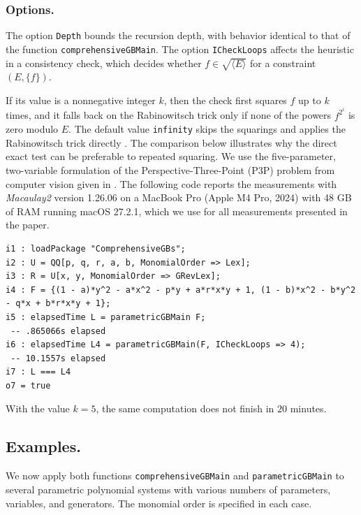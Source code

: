 \documentclass[11pt]{amsart}
\theoremstyle{plain}
\theoremstyle{definition}
\theoremstyle{remark}
\begin{document}
\subsubsection{Options.} The option \texttt{Depth} bounds the recursion depth, with behavior identical to that of the function \texttt{comprehensiveGBMain}.
The option \texttt{ICheckLoops} affects the heuristic in a consistency check, which decides whether $f\in\sqrt{\langle E\rangle}$ for a constraint $(E,\lbrace f\rbrace)$.



If its value is a nonnegative integer $k$, then the check first squares $f$ up to $k$ times, and it falls back on the Rabinowitsch trick only if none of the powers $f^{2^i}$ is zero modulo $E$.
The default value \texttt{infinity} skips the squarings and applies the Rabinowitsch trick directly \cite[Chapter~4, Proposition~8]{cox2007ideals}.
The comparison below illustrates why the direct exact test can be preferable to repeated squaring.
We use the five-parameter, two-variable formulation of the Perspective-Three-Point (P3P) problem from computer vision given in \cite[Section~8]{KAPUR201327}.
The following code reports the measurements with \emph{Macaulay2} version 1.26.06 on a MacBook Pro (Apple M4 Pro, 2024) with 48 GB of RAM running macOS 27.2.1, which we use for all measurements presented in the paper.
\begin{lstlisting}
i1 : loadPackage "ComprehensiveGBs";
i2 : U = QQ[p, q, r, a, b, MonomialOrder => Lex];
i3 : R = U[x, y, MonomialOrder => GRevLex];
i4 : F = {(1 - a)*y^2 - a*x^2 - p*y + a*r*x*y + 1, (1 - b)*x^2 - b*y^2 - q*x + b*r*x*y + 1};
i5 : elapsedTime L = parametricGBMain F;
 -- .865066s elapsed
i6 : elapsedTime L4 = parametricGBMain(F, ICheckLoops => 4);
 -- 10.1557s elapsed
i7 : L === L4
o7 = true
\end{lstlisting}
With the value $k=5$, the same computation does not finish in $20$ minutes.

\subsection{Examples.}
We now apply both functions \texttt{comprehensiveGBMain} and \texttt{parametricGBMain} to several
parametric polynomial systems with various numbers
of parameters, variables, and generators. The monomial order is specified in each case.
\end{document}
